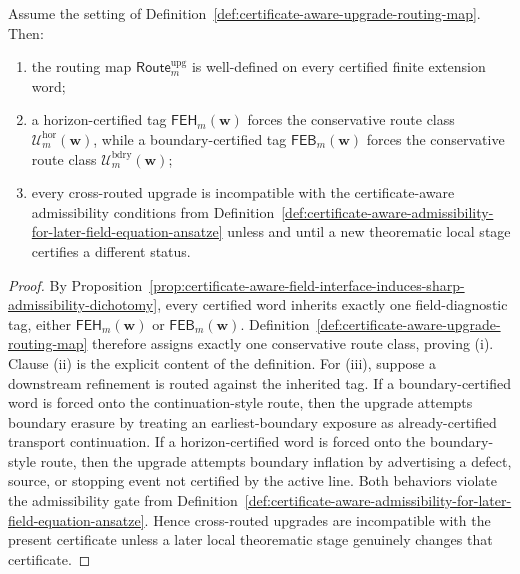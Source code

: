 \begin{proposition}
\label{prop:inherited-field-diagnostic-tag-forces-unique-conservative-upgrade-route}
Assume the setting of Definition~\ref{def:certificate-aware-upgrade-routing-map}. Then:
\begin{enumerate}[label=(\roman*)]
  \item the routing map \(\mathsf{Route}^{\mathrm{upg}}_{m}\) is well-defined on every certified finite extension word;
  \item a horizon-certified tag \(\mathsf{FEH}_{m}(\mathbf w)\) forces the conservative route class \(\mathcal U^{\mathrm{hor}}_{m}(\mathbf w)\), while a boundary-certified tag \(\mathsf{FEB}_{m}(\mathbf w)\) forces the conservative route class \(\mathcal U^{\mathrm{bdry}}_{m}(\mathbf w)\);
  \item every cross-routed upgrade is incompatible with the certificate-aware admissibility conditions from Definition~\ref{def:certificate-aware-admissibility-for-later-field-equation-ansatze} unless and until a new theorematic local stage certifies a different status.
\end{enumerate}
\end{proposition}

\begin{proof}
By Proposition~\ref{prop:certificate-aware-field-interface-induces-sharp-admissibility-dichotomy}, every certified word inherits exactly one field-diagnostic tag, either \(\mathsf{FEH}_{m}(\mathbf w)\) or \(\mathsf{FEB}_{m}(\mathbf w)\). Definition~\ref{def:certificate-aware-upgrade-routing-map} therefore assigns exactly one conservative route class, proving (i). Clause (ii) is the explicit content of the definition. For (iii), suppose a downstream refinement is routed against the inherited tag. If a boundary-certified word is forced onto the continuation-style route, then the upgrade attempts boundary erasure by treating an earliest-boundary exposure as already-certified transport continuation. If a horizon-certified word is forced onto the boundary-style route, then the upgrade attempts boundary inflation by advertising a defect, source, or stopping event not certified by the active line. Both behaviors violate the admissibility gate from Definition~\ref{def:certificate-aware-admissibility-for-later-field-equation-ansatze}. Hence cross-routed upgrades are incompatible with the present certificate unless a later local theorematic stage genuinely changes that certificate.
\end{proof}

